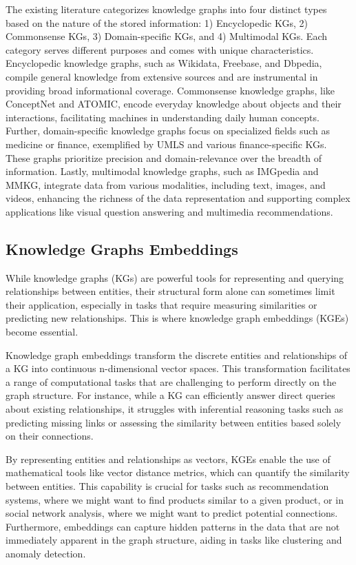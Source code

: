 \documentclass{article}
\begin{document}
The existing literature categorizes knowledge graphs into four distinct types based on the nature of the stored information: 1) Encyclopedic KGs, 2) Commonsense KGs, 3) Domain-specific KGs, and 4) Multimodal KGs. Each category serves different purposes and comes with unique characteristics. Encyclopedic knowledge graphs, such as Wikidata, Freebase, and Dbpedia, compile general knowledge from extensive sources and are instrumental in providing broad informational coverage. Commonsense knowledge graphs, like ConceptNet and ATOMIC, encode everyday knowledge about objects and their interactions, facilitating machines in understanding daily human concepts. Further, domain-specific knowledge graphs focus on specialized fields such as medicine or finance, exemplified by UMLS and various finance-specific KGs. These graphs prioritize precision and domain-\hspace{0pt}relevance over the breadth of information. Lastly, multimodal knowledge graphs, such as IMGpedia and MMKG, integrate data from various modalities, including text, images, and videos, enhancing the richness of the data representation and supporting complex applications like visual question answering and multimedia recommendations.

\subsection{Knowledge Graphs Embeddings}

While knowledge graphs (KGs) are powerful tools for representing and querying relationships between entities, their structural form alone can sometimes limit their application, especially in tasks that require measuring similarities or predicting new relationships. This is where knowledge graph embeddings (KGEs) become essential.

Knowledge graph embeddings transform the discrete entities and relationships of a KG into continuous n-dimensional vector spaces. This transformation facilitates a range of computational tasks that are challenging to perform directly on the graph structure. For instance, while a KG can efficiently answer direct queries about existing relationships, it struggles with inferential reasoning tasks such as predicting missing links or assessing the similarity between entities based solely on their connections.

By representing entities and relationships as vectors, KGEs enable the use of mathematical tools like vector distance metrics, which can quantify the similarity between entities. This capability is crucial for tasks such as recommendation systems, where we might want to find products similar to a given product, or in social network analysis, where we might want to predict potential connections. Furthermore, embeddings can capture hidden patterns in the data that are not immediately apparent in the graph structure, aiding in tasks like clustering and anomaly detection.
\end{document}
